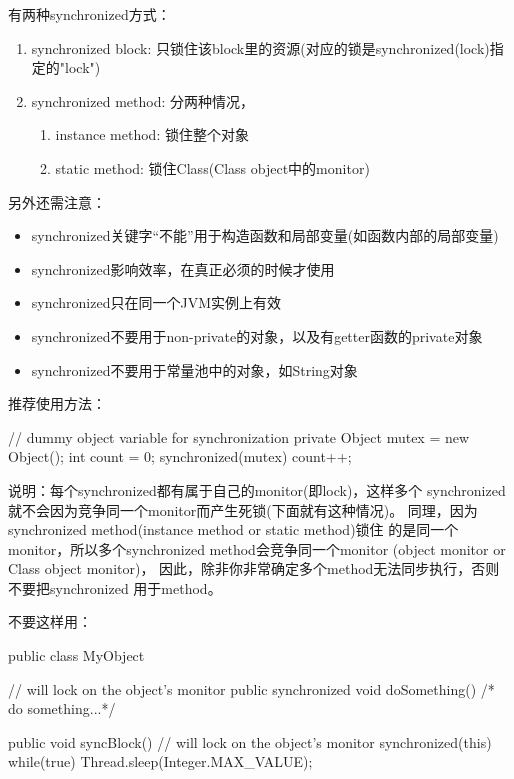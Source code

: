 有两种synchronized方式：
\begin{enumerate}
\item synchronized block: 只锁住该block里的资源(对应的锁是synchronized(lock)指定的"lock")
\item synchronized method: 分两种情况，
  \begin{enumerate}
    \item instance method: 锁住整个对象
    \item static method: 锁住Class(Class object中的monitor)
  \end{enumerate}
\end{enumerate}
另外还需注意：
\begin{itemize}
\item synchronized关键字“不能”用于构造函数和局部变量(如函数内部的局部变量)
\item synchronized影响效率，在真正必须的时候才使用
\item synchronized只在同一个JVM实例上有效
\item synchronized不要用于non-private的对象，以及有getter函数的private对象
\item synchronized不要用于常量池中的对象，如String对象
\end{itemize}
推荐使用方法：\\
\begin{javacode}
// dummy object variable for synchronization
private Object mutex = new Object();
int count = 0;
synchronized(mutex) {
    count++;
}
\end{javacode}

说明：每个synchronized都有属于自己的monitor(即lock)，这样多个
synchronized就不会因为竞争同一个monitor而产生死锁(下面就有这种情况)。
同理，因为synchronized method(instance method or static method)锁住
的是同一个monitor，所以多个synchronized method会竞争同一个monitor
(object monitor or Class object monitor)，
因此，除非你非常确定多个method无法同步执行，否则不要把synchronized
用于method。

不要这样用：\\
\begin{javacode}
public class MyObject {
    // will lock on the object's monitor
    public synchronized void doSomething() {
        /* do something...*/
    }

    public void syncBlock() {
        // will lock on the object's monitor
        synchronized(this) {
            while(true) {
                Thread.sleep(Integer.MAX_VALUE);
            }
        }
    }
}
\end{javacode}

